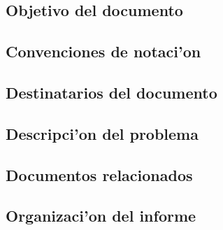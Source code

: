  \subsection{ Objetivo del documento	}
 \subsection{ Convenciones de notaci'on	}
 \subsection{ Destinatarios del documento	}
 \subsection{ Descripci'on del problema 	}
 \subsection{ Documentos relacionados	}
 \subsection{ Organizaci'on del informe	}
